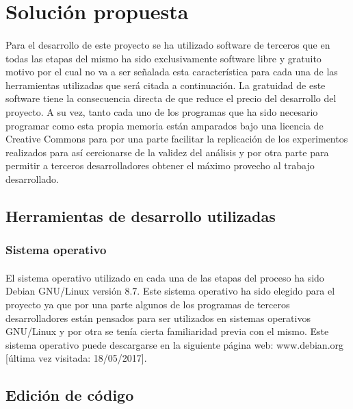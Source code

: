 \documentclass{article}
\author{Adrián Gil Moral }
\begin{document}
\section{Solución propuesta}

\paragraph{}
Para el desarrollo de este proyecto se ha utilizado software de terceros que en todas las etapas del mismo ha sido exclusivamente software libre y gratuito motivo por el cual no va a ser señalada esta característica para cada una de las herramientas utilizadas que será citada a continuación. La gratuidad de este software tiene la consecuencia directa de que reduce el precio del desarrollo del proyecto. A su vez, tanto cada uno de los programas que ha sido necesario programar como esta propia memoria están amparados bajo una licencia de Creative Commons para por una parte facilitar la replicación de los experimentos realizados para así cercionarse de la validez del análisis y por otra parte para permitir a terceros desarrolladores obtener el máximo provecho al trabajo desarrollado.

\subsection{Herramientas de desarrollo utilizadas}

\subsubsection{Sistema operativo}

\paragraph{}
El sistema operativo utilizado en cada una de las etapas del proceso ha sido Debian GNU/Linux versión 8.7. Este sistema operativo ha sido elegido para el proyecto ya que por una parte algunos de los programas de terceros desarrolladores están pensados para ser utilizados en sistemas operativos GNU/Linux y por otra se tenía cierta familiaridad previa con el mismo. Este sistema operativo puede descargarse en la siguiente página web: www.debian.org [última vez visitada: 18/05/2017].

\subsection{Edición de código}
\end{document}

